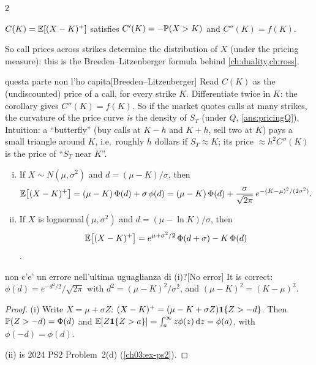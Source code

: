 \begin{paracol}{2}
\begin{corollary}\label{ch03:cor-bl}
$C(K)=\mathbb{E}[(X-K)^+]$ satisfies $C'(K)=-\mathbb{P}(X>K)$ and $C''(K)=f(K)$.
\end{corollary}
So call prices across strikes determine the distribution of $X$ (under the pricing measure): this is
the Breeden--Litzenberger formula behind \cref{ch:duality,ch:ross}.\begin{answer}{questa parte non l'ho capita}[Breeden--Litzenberger]
Read $C(K)$ as the (undiscounted) price of a call, for every strike $K$. Differentiate twice in $K$: the
corollary gives $C''(K)=f(K)$. So if the market quotes calls at many strikes, the curvature of the price
curve \emph{is} the density of $S_T$ (under $Q$, \cref{ans:pricingQ}). Intuition: a ``butterfly''
(buy calls at $K-h$ and $K+h$, sell two at $K$) pays a small triangle around $K$, i.e.\ roughly
$h$ dollars if $S_T\approx K$; its price $\approx h^2C''(K)$ is the price of ``$S_T$ near $K$''.
\end{answer}

\begin{corollary}\label{ch03:cor-normal}
\leavevmode
\begin{enumerate}[(i)]
  \item If $X\sim N(\mu,\sigma^2)$ and $d=(\mu-K)/\sigma$, then
      \[
      \mathbb{E}\bigl[(X-K)^+\bigr]=(\mu-K)\,\Phi(d)+\sigma\,\phi(d)=(\mu-K)\,\Phi(d)+\frac{\sigma}{\sqrt{2\pi}}\,e^{-(K-\mu)^2/(2\sigma^2)} .
      \]
  \item If $X$ is lognormal$(\mu,\sigma^2)$ and $d=(\mu-\ln K)/\sigma$, then
      \[
      \mathbb{E}\bigl[(X-K)^+\bigr]=e^{\mu+\sigma^2/2}\,\Phi(d+\sigma)-K\,\Phi(d)
      \]
      .
\end{enumerate}
\end{corollary}\begin{answer}{non c'e' un errore nell'ultima uguaglianza di (i)?}[No error]
It is correct: $\phi(d)=e^{-d^2/2}/\sqrt{2\pi}$ with $d^2=(\mu-K)^2/\sigma^2$, and $(\mu-K)^2=(K-\mu)^2$.
\end{answer}
\begin{proof}
(i) Write $X=\mu+\sigma Z$: $(X-K)^+=(\mu-K+\sigma Z)\mathbf{1}\{Z>-d\}$. Then $\mathbb{P}(Z>-d)=\Phi(d)$ and
$\mathbb{E}[Z\mathbf{1}\{Z>a\}]=\int_a^\infty z\phi(z)\,\mathrm{d} z=\phi(a)$, with $\phi(-d)=\phi(d)$.

(ii) is 2024 PS2 Problem~2(d)
(\cref{ch03:ex-ps2}).
\end{proof}


\end{paracol}

